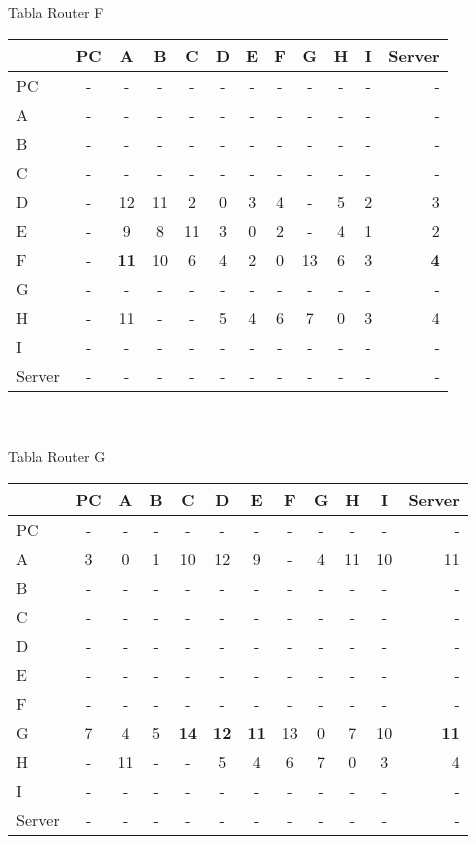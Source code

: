 \documentclass{article}
\begin{document}
\\
\\
Tabla Router F \\
\begin{tabular}{l*{10}{c}r}
              & PC & A & B & C & D & E & F & G & H & I & Server \\
\hline
PC             & - & - & - & - & - & - & - & - & - & - & -\\
A              & - & - & - & - & - & - & - & - & - & - & -\\
B              & - & - & - & - & - & - & - & - & - & - & -\\
C              & - & - & - & - & - & - & - & - & - & - & -\\
D              & - & 12 & 11 & 2 & 0 & 3 & 4 & - & 5 & 2 & 3\\
E              & - & 9 & 8 & 11 & 3 & 0 & 2 & - & 4 & 1 & 2\\
F              & - &\bf{11}& 10 & 6 & 4 & 2 & 0 & 13 & 6 & 3 &\bf{4}\\
G              & - & - & - & - & - & - & - & - & - & - & -\\
H              & - & 11 & - & - & 5 & 4 & 6 & 7 & 0 & 3 & 4\\
I              & - & - & - & - & - & - & - & - & - & - & -\\
Server         & - & - & - & - & - & - & - & - & - & - & -\\

\end{tabular}
\\
\\
Tabla Router G \\
\begin{tabular}{l*{10}{c}r}
              & PC & A & B & C & D & E & F & G & H & I & Server \\
\hline
PC             & - & - & - & - & - & - & - & - & - & - & -\\
A              & 3 & 0 & 1 & 10 & 12 & 9 & - & 4 & 11 & 10 & 11 \\
B              & - & - & - & - & - & - & - & - & - & - & -\\
C              & - & - & - & - & - & - & - & - & - & - & -\\
D              & - & - & - & - & - & - & - & - & - & - & -\\
E              & - & - & - & - & - & - & - & - & - & - & -\\
F              & - & - & - & - & - & - & - & - & - & - & -\\
G              & 7 & 4 & 5 &\bf{14}&\bf{12}&\bf{11}& 13 & 0 & 7 & 10 &\bf{11}\\
H              & - & 11 & - & - & 5 & 4 & 6 & 7 & 0 & 3 & 4\\
I              & - & - & - & - & - & - & - & - & - & - & -\\
Server         & - & - & - & - & - & - & - & - & - & - & -\\

\end{tabular}
\end{document}
